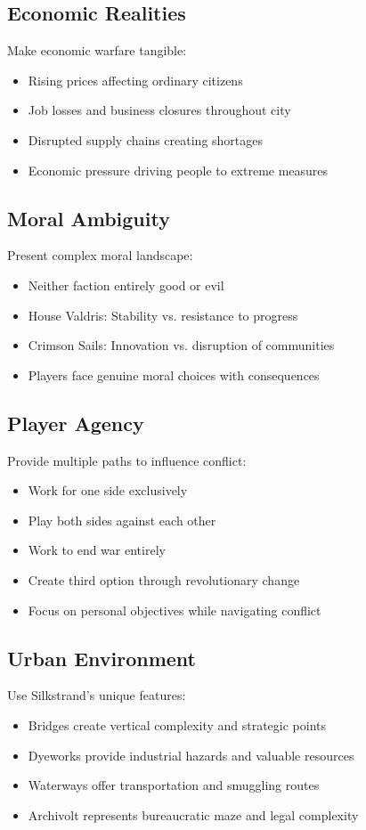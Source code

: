 \documentclass[11pt]{article}
\begin{document}
\subsection{Economic Realities}
Make economic warfare tangible:
\begin{itemize}
\item Rising prices affecting ordinary citizens
\item Job losses and business closures throughout city
\item Disrupted supply chains creating shortages
\item Economic pressure driving people to extreme measures
\end{itemize}

\subsection{Moral Ambiguity}
Present complex moral landscape:
\begin{itemize}
\item Neither faction entirely good or evil
\item House Valdris: Stability vs. resistance to progress
\item Crimson Sails: Innovation vs. disruption of communities
\item Players face genuine moral choices with consequences
\end{itemize}

\subsection{Player Agency}
Provide multiple paths to influence conflict:
\begin{itemize}
\item Work for one side exclusively
\item Play both sides against each other
\item Work to end war entirely
\item Create third option through revolutionary change
\item Focus on personal objectives while navigating conflict
\end{itemize}

\subsection{Urban Environment}
Use Silkstrand's unique features:
\begin{itemize}
\item Bridges create vertical complexity and strategic points
\item Dyeworks provide industrial hazards and valuable resources
\item Waterways offer transportation and smuggling routes
\item Archivolt represents bureaucratic maze and legal complexity
\end{itemize}
\end{document}
